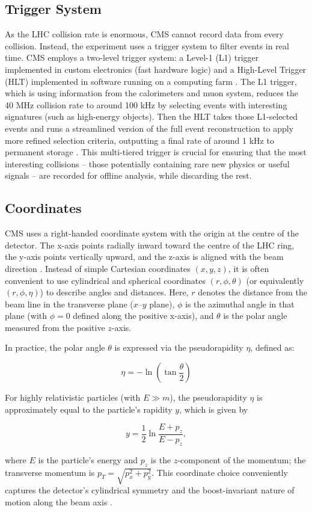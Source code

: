 \subsection{Trigger System}
As the LHC collision rate is enormous, CMS cannot record data from every collision. Instead, the experiment uses a trigger system to filter events in real time. CMS employs a two-level trigger system: a Level-1 (L1) trigger implemented in custom electronics (fast hardware logic) and a High-Level Trigger (HLT) implemented in software running on a computing farm \cite{Khachatryan_2017}. The L1 trigger, which is using information from the calorimeters and muon system, reduces the 40 MHz collision rate to around 100 kHz by selecting events with interesting signatures (such as high-energy objects). Then the HLT takes those L1-selected events and runs a streamlined version of the full event reconstruction to apply more refined selection criteria, outputting a final rate of around 1 kHz to permanent storage \cite{Khachatryan_2017}. This multi-tiered trigger is crucial for ensuring that the most interesting collisions – those potentially containing rare new physics or useful signals – are recorded for offline analysis, while discarding the rest.

\subsection{Coordinates}
CMS uses a right-handed coordinate system with the origin at the centre of the detector. The x-axis points radially inward toward the centre of the LHC ring, the y-axis points vertically upward, and the z-axis is aligned with the beam direction \cite{Chatrychan_2008}. Instead of simple Cartesian coordinates $(x,y,z)$, it is often convenient to use cylindrical and spherical coordinates $(r,\phi,\theta)$ (or equivalently $(r,\phi,\eta)$) to describe angles and distances. Here, $r$ denotes the distance from the beam line in the transverse plane ($x$–$y$ plane), $\phi$ is the azimuthal angle in that plane (with $\phi=0$ defined along the positive x-axis), and $\theta$ is the polar angle measured from the positive $z$-axis.

In practice, the polar angle $\theta$ is expressed via the pseudorapidity $\eta$, defined as:

\begin{equation}
    \eta = - \ln \left( \tan \frac{\theta}{2}\right)
\end{equation}

For highly relativistic particles (with $E \gg m$), the pseudorapidity $\eta$ is approximately equal to the particle’s rapidity $y$, which is given by

\begin{equation}
    y = \frac{1}{2} \ln\frac{E+p_z}{E-p_z},
\end{equation}

where $E$ is the particle’s energy and $p_z$ is the $z$-component of the momentum; the transverse momentum is $p_T=\sqrt{p_x^2+p_y^2}$. This coordinate choice conveniently captures the detector’s cylindrical symmetry and the boost-invariant nature of motion along the beam axis \cite{Chatrychan_2008}.